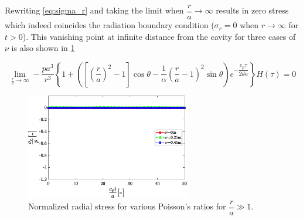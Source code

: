 \documentclass{article}
\begin{document}
Rewriting \cref{eq:sigma_r} and taking the limit when $\dfrac{r}{a} \to \infty$ results in zero stress which indeed coincides the radiation boundary condition ($\sigma_r = 0$ when $r \to  \infty$ for $t>0$). This vanishing point at infinite distance from the cavity for three cases of $\nu$ is also shown in \cref{fig:7.5}

\begin{equation*}
    \lim_{\textstyle\frac{r}{a} \to \infty} -\frac{pa^3}{r^3} \left \{ 1 + \left( \left[\left(\frac{r}{a}\right)^2 - 1 \right]\cos\theta - \frac{1}{\alpha} \left(\frac{r}{a}-1\right)^2 \sin\theta \right) e^{-\dfrac{c_p\tau}{2da}} \right \} H(\tau) = 0
\end{equation*}

\begin{figure}[H]
    \centering
    \includegraphics[width = 0.64\textwidth]{figures/large_r.eps}
    \caption{Normalized radial stress for various Poisson's ratios for $\dfrac{r}{a} \gg 1$.}
    \label{fig:7.5}
\end{figure}


\newpage


\end{document}

